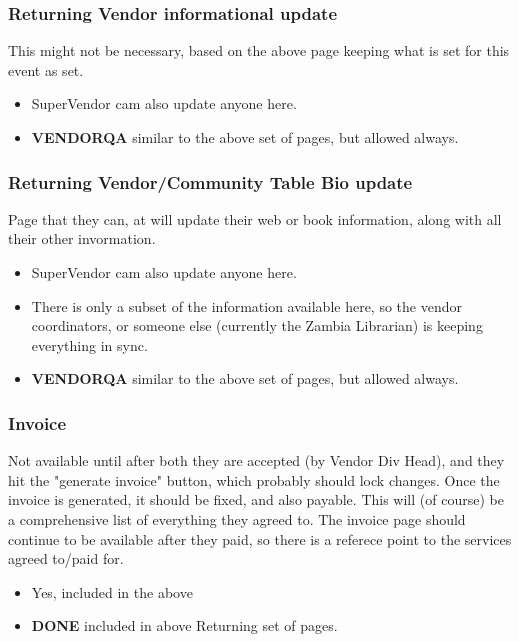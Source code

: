 \documentclass[captions=tablesignature]{scrartcl}
\begin{document}
\subsubsection{Returning Vendor informational update}
\label{sec-3-1-6}
This might not be necessary, based on the above page keeping what
is set for this event as set.
\begin{itemize}
\item SuperVendor cam also update anyone here.
\end{itemize}
\begin{itemize}
\item {\bfseries\sffamily VENDORQA} similar to the above set of pages, but allowed always.
\label{sec-3-1-6-1}
\end{itemize}

\subsubsection{Returning Vendor/Community Table Bio update}
\label{sec-3-1-7}
Page that they can, at will update their web or book information,
along with all their other invormation.
\begin{itemize}
\item SuperVendor cam also update anyone here.
\item There is only a subset of the information available here, so
the vendor coordinators, or someone else (currently the Zambia
Librarian) is keeping everything in sync.
\end{itemize}
\begin{itemize}
\item {\bfseries\sffamily VENDORQA} similar to the above set of pages, but allowed always.
\label{sec-3-1-7-1}
\end{itemize}

\subsubsection{Invoice}
\label{sec-3-1-8}
Not available until after both they are accepted (by Vendor
Div Head), and they hit the "generate invoice" button, which
probably should lock changes.  Once the invoice is generated, it
should be fixed, and also payable.
This will (of course) be a comprehensive list of everything they
agreed to.  The invoice page should continue to be available after
they paid, so there is a referece point to the services agreed
to/paid for.
\begin{itemize}
\item Yes, included in the above
\end{itemize}
\begin{itemize}
\item {\bfseries\sffamily DONE} included in above Returning set of pages.
\label{sec-3-1-8-1}
\end{itemize}
\end{document}
